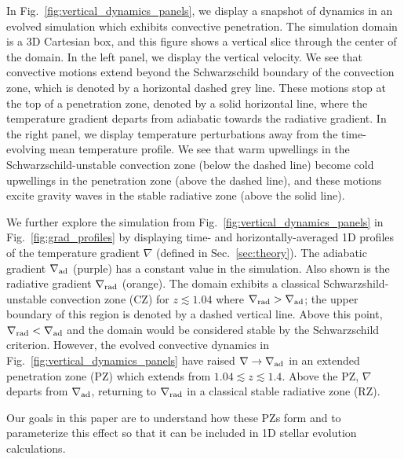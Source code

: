 \documentclass[twocolumn]{aastex631}
\newcommand{\gradrad}{\ensuremath{\nabla_{\rm{rad}}}}
\newcommand{\gradad}{\ensuremath{\nabla_{\rm{ad}}}}
\newcommand{\justgrad}{\ensuremath{\nabla}}
\begin{document}
In Fig.~\ref{fig:vertical_dynamics_panels}, we display a snapshot of dynamics in an evolved simulation which exhibits convective penetration.
The simulation domain is a 3D Cartesian box, and this figure shows a vertical slice through the center of the domain.
In the left panel, we display the vertical velocity.
We see that convective motions extend beyond the Schwarzschild boundary of the convection zone, which is denoted by a horizontal dashed grey line.
These motions stop at the top of a penetration zone, denoted by a solid horizontal line, where the temperature gradient departs from adiabatic towards the radiative gradient.
In the right panel, we display temperature perturbations away from the time-evolving mean temperature profile.
We see that warm upwellings in the Schwarzschild-unstable convection zone (below the dashed line) become cold upwellings in the penetration zone (above the dashed line), and these motions excite gravity waves in the stable radiative zone (above the solid line).

We further explore the simulation from Fig.~\ref{fig:vertical_dynamics_panels} in Fig.~\ref{fig:grad_profiles} by displaying time- and horizontally-averaged 1D profiles of the temperature gradient $\justgrad$ (defined in Sec.~\ref{sec:theory}).
The adiabatic gradient $\gradad$ (purple) has a constant value in the simulation.
Also shown is the radiative gradient $\gradrad$ (orange).
The domain exhibits a classical Schwarzshild-unstable convection zone (CZ) for $z \lesssim 1.04$ where $\gradrad > \gradad$; the upper boundary of this region is denoted by a dashed vertical line.
Above this point, $\gradrad < \gradad$ and the domain would be considered stable by the Schwarzschild criterion.
However, the evolved convective dynamics in Fig.~\ref{fig:vertical_dynamics_panels} have raised $\justgrad \rightarrow \gradad$ in an extended penetration zone (PZ) which extends from $1.04 \lesssim z \lesssim 1.4$.
Above the PZ, $\justgrad$ departs from $\gradad$, returning to $\gradrad$ in a classical stable radiative zone (RZ).

Our goals in this paper are to understand how these PZs form and to parameterize this effect so that it can be included in 1D stellar evolution calculations.
\end{document}
